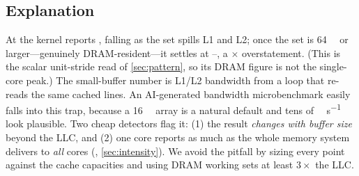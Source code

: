 \subsection{Explanation}
At  the kernel reports ,
falling as the set spills L1 and L2; once the set is \qty{64}{\mebi\byte} or larger---genuinely
DRAM-resident---it settles at --, a
$\times$ overstatement. (This is the scalar unit-stride read of \cref{sec:pattern}, so its
DRAM figure is not the single-core peak.) The small-buffer number is L1/L2 bandwidth from a loop that
re-reads the same cached lines. An AI-generated bandwidth microbenchmark easily falls into this trap,
because a \qty{16}{\kibi\byte} array is a natural default and tens of \unit{\gibi\byte\per\second} look
plausible. Two cheap detectors flag it: (1) the result \emph{changes with buffer size} beyond the LLC, and (2) one
core reports as much as the whole memory system delivers to \emph{all} cores (, \cref{sec:intensity}). We avoid the pitfall by sizing every point against the cache capacities and using DRAM working sets
at least $3\times$ the LLC.
